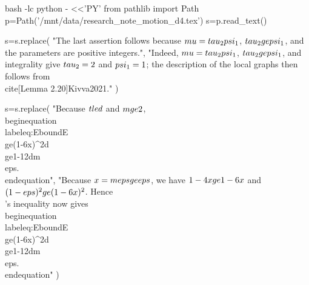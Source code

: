 bash -lc python - <<'PY'
from pathlib import Path
p=Path('/mnt/data/research_note_motion_d4.tex')
s=p.read_text()

s=s.replace(
"The last assertion follows because $\\mu=\\tau_2\\psi_1$, $\\tau_2\\ge\\psi_1$, and the parameters are positive integers.",
"Indeed, $\\mu=\\tau_2\\psi_1$, $\\tau_2\\ge\\psi_1$, and integrality give $\\tau_2=2$ and $\\psi_1=1$; the description of the local graphs then follows from \\cite[Lemma 2.20]{Kivva2021}."
)

s=s.replace(
"Because $t\\le d$ and $m\\ge2$,\n\\begin{equation}\\label{eq:Ebound}\n E\\ge(1-6x)^{2d}\\ge1-12dm\\eps.\n\\end{equation}",
"Because $x=m\\eps\\ge\\eps$, we have $1-4x\\ge1-6x$ and $(1-\\eps)^2\\ge(1-6x)^2$. Hence\n\\[\n E\\ge(1-6x)^{2t-1}\\ge(1-6x)^{2d}.\n\\]\nBernoulli's inequality now gives\n\\begin{equation}\\label{eq:Ebound}\n E\\ge(1-6x)^{2d}\\ge1-12dm\\eps.\n\\end{equation}"
)

